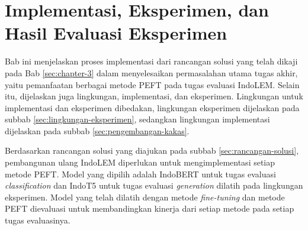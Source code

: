 \chapter{Implementasi, Eksperimen, dan Hasil Evaluasi Eksperimen}

Bab ini menjelaskan proses implementasi dari rancangan solusi yang telah dikaji pada Bab \ref{sec:chapter-3} dalam menyelesaikan permasalahan utama tugas akhir, yaitu pemanfaatan berbagai metode PEFT pada tugas evaluasi IndoLEM. Selain itu, dijelaskan juga lingkungan, implementasi, dan eksperimen. Lingkungan untuk implementasi dan eksperimen dibedakan, lingkungan eksperimen dijelaskan pada subbab \ref{sec:lingkungan-eksperimen}, sedangkan lingkungan implementasi dijelaskan pada subbab \ref{sec:pengembangan-kakas}.

Berdasarkan rancangan solusi yang diajukan pada subbab \ref{sec:rancangan-solusi}, pembangunan ulang IndoLEM diperlukan untuk mengimplementasi setiap metode PEFT. Model yang dipilih adalah IndoBERT untuk tugas evaluasi \textit{classification} dan IndoT5 untuk tugas evaluasi \textit{generation} dilatih pada lingkungan eksperimen. Model yang telah dilatih dengan metode \textit{fine-tuning}  dan metode PEFT dievaluasi untuk membandingkan kinerja dari setiap metode pada setiap tugas evaluasinya.







